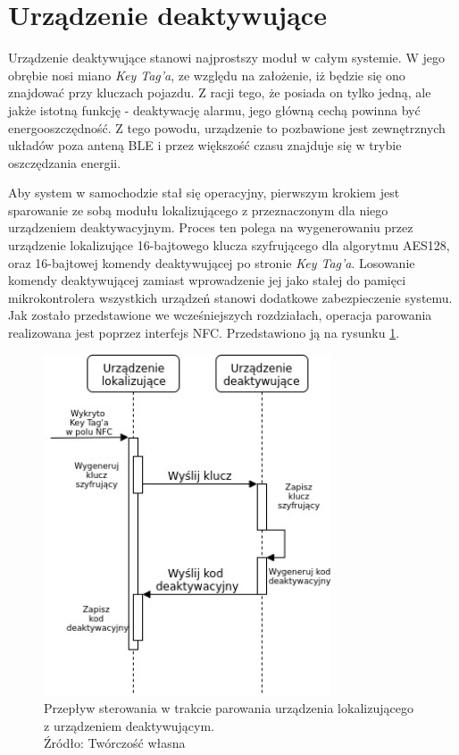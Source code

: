 \section{Urządzenie deaktywujące}
\label{key_tag}

Urządzenie deaktywujące stanowi najprostszy moduł w całym systemie. W jego obrębie nosi miano \textit{Key Tag'a}, ze względu na założenie, iż będzie się ono znajdować przy kluczach pojazdu. Z racji tego, że posiada on tylko jedną, ale jakże istotną funkcję - deaktywację alarmu, jego główną cechą powinna być energooszczędność. Z tego powodu, urządzenie to  pozbawione jest zewnętrznych układów poza anteną BLE i przez większość czasu znajduje się w trybie oszczędzania energii. 

Aby system w samochodzie stał się operacyjny, pierwszym krokiem jest sparowanie ze sobą modułu lokalizującego z przeznaczonym dla niego urządzeniem deaktywacyjnym. Proces ten polega na wygenerowaniu przez urządzenie lokalizujące 16-bajtowego klucza szyfrującego dla algorytmu AES128, oraz 16-bajtowej komendy deaktywującej po stronie \textit{Key Tag'a}. Losowanie komendy deaktywującej zamiast wprowadzenie jej jako stałej do pamięci mikrokontrolera wszystkich urządzeń stanowi dodatkowe zabezpieczenie systemu. Jak zostało przedstawione we wcześniejszych rozdziałach, operacja parowania realizowana jest poprzez interfejs NFC. Przedstawiono ją na rysunku \ref{fig:image_soft_keytag_key exchange}.

\begin{figure}[H]
	\centering
	\includegraphics[width=8.5cm]{img/software/keytag/Key_exchange.jpg}
	\caption{Przepływ sterowania w trakcie parowania urządzenia lokalizującego z urządzeniem deaktywującym. 
	\\Źródło: Twórczość własna}
	\label{fig:image_soft_keytag_key exchange}
\end{figure}

